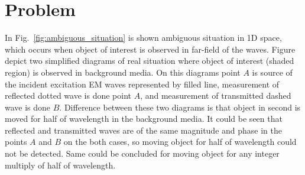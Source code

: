 \documentclass[conference]{IEEEtran}
\begin{document}
\section{Problem}
\label{sec:problem}
In Fig.~\ref{fig:ambiguous_situation} is shown ambiguous situation in 1D space,
which occurs when object of interest is observed in far-field of the waves.
Figure depict two simplified diagrams of real situation where 
object of interest (shaded region) is observed in background media.
On this diagrams point $A$ is source 
of the incident excitation EM waves represented by filled line,
measurement of reflected dotted wave is done point $A$,
and measurement of transmitted dashed wave is done $B$. 
Difference between these two diagrams is that object in second is moved
for half of wavelength in the background media.
It could be seen that reflected and transmitted waves are of the same 
magnitude and phase in the points $A$ and $B$ on the both cases,
so moving object for half of wavelength could not be detected.
Same could be concluded for moving object 
for any integer multiply of half of wavelength.
\end{document}
